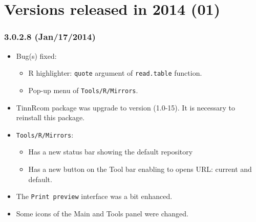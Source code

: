 
\section{Versions released in 2014 (01)}

\subsubsection{3.0.2.8 (Jan/17/2014)}
\begin{itemize}
  \item Bug(s) fixed:
    \begin{itemize}
      \item R highlighter: \texttt{quote} argument of \texttt{read.table} function.
      \item Pop-up menu of \texttt{Tools/R/Mirrors}.
    \end{itemize}
  \item TinnRcom package was upgrade to version (1.0-15).
   It is necessary to reinstall this package.
  \item \texttt{Tools/R/Mirrors}:
    \begin{itemize}
       \item Has a new status bar showing the default repository
       \item Has a new button on the Tool bar enabling to opens URL: current and default.
    \end{itemize}
  \item The \texttt{Print preview} interface was a bit enhanced.
  \item Some icons of the Main and Tools panel were changed.
\end{itemize}
